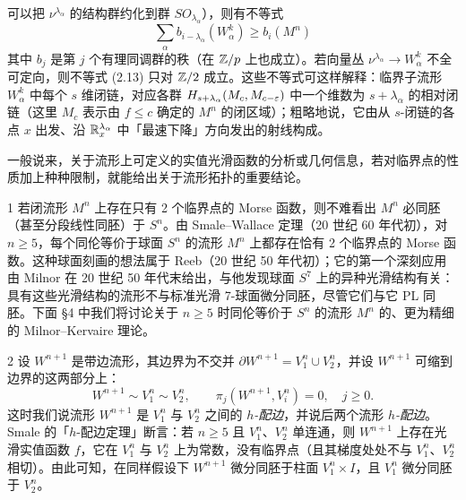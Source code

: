 可以把 $\nu^{\lambda_\alpha}$ 的结构群约化到群 $SO_{\lambda_\alpha}$），则有不等式
\begin{equation}
  \sum_{\alpha}b_{i-\lambda_\alpha}(W^k_\alpha)\ge b_i(M^n) \tag{2.13}
\end{equation}
其中 $b_j$ 是第 $j$ 个有理同调群的秩（在 $\mathbb{Z}/p$ 上也成立）。若向量丛 $\nu^{\lambda_\alpha}\to W^k_\alpha$ 不全可定向，则不等式 (2.13) 只对 $\mathbb{Z}/2$ 成立。这些不等式可这样解释：临界子流形 $W^k_\alpha$ 中每个 $s$ 维闭链，对应各群 $H_{s+\lambda_\alpha}(M_c,M_{c-\varepsilon})$ 中一个维数为 $s+\lambda_\alpha$ 的相对闭链（这里 $M_c$ 表示由 $f\le c$ 确定的 $M^n$ 的闭区域）；粗略地说，它由从 $s$-闭链的各点 $x$ 出发、沿 $\mathbb{R}^{\lambda_\alpha}_x$ 中「最速下降」方向发出的射线构成。

一般说来，关于流形上可定义的实值光滑函数的分析或几何信息，若对临界点的性质加上种种限制，就能给出关于流形拓扑的重要结论。

\begin{example*}{1}
若闭流形 $M^n$ 上存在只有 2 个临界点的 Morse 函数，则不难看出 $M^n$ 必同胚（甚至分段线性同胚）于 $S^n$。由 Smale--Wallace 定理（20 世纪 60 年代初），对 $n\ge5$，每个同伦等价于球面 $S^n$ 的流形 $M^n$ 上都存在恰有 2 个临界点的 Morse 函数。这种球面刻画的想法属于 Reeb（20 世纪 50 年代初）；它的第一个深刻应用由 Milnor 在 20 世纪 50 年代末给出，与他发现球面 $S^7$ 上的异种光滑结构有关：具有这些光滑结构的流形不与标准光滑 7-球面微分同胚，尽管它们与它 PL 同胚。下面 §4 中我们将讨论关于 $n\ge5$ 时同伦等价于 $S^n$ 的流形 $M^n$ 的、更为精细的 Milnor--Kervaire 理论。
\end{example*}

\begin{example*}{2}
设 $W^{n+1}$ 是带边流形，其边界为不交并 $\partial W^{n+1}=V^n_1\cup V^n_2$，并设 $W^{n+1}$ 可缩到边界的这两部分上：
\[
  W^{n+1}\sim V^n_1\sim V^n_2,\qquad \pi_j(W^{n+1},V^n_i)=0,\quad j\ge0.
\]
这时我们说流形 $W^{n+1}$ 是 $V^n_1$ 与 $V^n_2$ 之间的 \emph{$h$-配边}，并说后两个流形 \emph{$h$-配边}。Smale 的「$h$-配边定理」断言：若 $n\ge5$ 且 $V^n_1$、$V^n_2$ 单连通，则 $W^{n+1}$ 上存在光滑实值函数 $f$，它在 $V^n_1$ 与 $V^n_2$ 上为常数，没有临界点（且其梯度处处不与 $V^n_1$、$V^n_2$ 相切）。由此可知，在同样假设下 $W^{n+1}$ 微分同胚于柱面 $V^n_1\times I$，且 $V^n_1$ 微分同胚于 $V^n_2$。
\end{example*}

